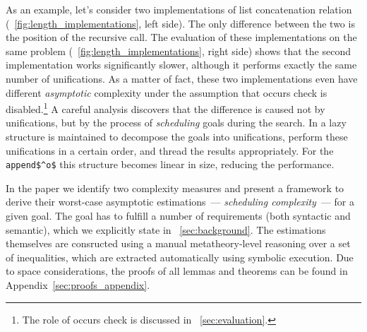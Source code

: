 As an example, let's consider two implementations of list concatenation relation (\figureword~\ref{fig:length_implementations}, left side). The only difference between the two is
the position of the recursive call.
The evaluation of these implementations on the same problem (\figureword~\ref{fig:length_implementations}, right side) shows that the second implementation works significantly
slower,
although it performs exactly the same number of unifications. As a matter of fact, these two implementations even have different \emph{asymptotic} complexity under the assumption
that occurs check is disabled.\footnote{The role of occurs check is discussed in
\sectionword~\ref{sec:evaluation}.}
A careful analysis discovers that the difference is caused not by unifications, but by the process of \emph{scheduling} goals during the search. In \mK a
lazy structure is maintained to decompose the goals into unifications, perform these unifications in a certain order, and thread the results appropriately. For the \lstinline|append$^o$|
this structure becomes linear in size, reducing the performance.

In the paper we identify two complexity measures and present a framework to derive their worst-case asymptotic estimations~--- \emph{scheduling complexity}~---
for a given goal. The goal has to fulfill a number of requirements (both syntactic and semantic), which we explicitly state in \sectionword~\ref{sec:background}. The estimations
themselves are consructed using a manual metatheory-level reasoning over a set of inequalities, which are extracted automatically using symbolic execution.
Due to space considerations, the proofs of all lemmas and theorems can be found in Appendix~\ref{sec:proofs_appendix}.


